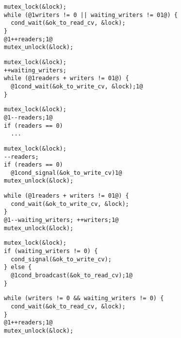 \usetikzlibrary{calc,fit,matrix,shapes.callouts}

\begingroup
{}
\newsavebox\rwLockPlusReaders%
\begin{lrbox}{\rwLockPlusReaders}
\begin{lstlisting}
mutex_lock(&lock);
while (@1writers != 0 || waiting_writers != 01@) {
  cond_wait(&ok_to_read_cv, &lock);
}
@1++readers;1@
mutex_unlock(&lock);
\end{lstlisting}
\end{lrbox}
\newsavebox\rwLockPlusWriters%
\begin{lrbox}{\rwLockPlusWriters}
\begin{lstlisting}
mutex_lock(&lock);
++waiting_writers;
while (@1readers + writers != 01@) {
  @1cond_wait(&ok_to_write_cv, &lock);1@
}
\end{lstlisting}
\end{lrbox}
\newsavebox\rwLockMinusReaders%
\begin{lrbox}{\rwLockMinusReaders}
\begin{lstlisting}
mutex_lock(&lock);
@1--readers;1@
if (readers == 0)
  ...
\end{lstlisting}
\end{lrbox}
\newsavebox\rwLockMinusReadersSignal%
\begin{lrbox}{\rwLockMinusReadersSignal}
\begin{lstlisting}
mutex_lock(&lock);
--readers;
if (readers == 0)
  @1cond_signal(&ok_to_write_cv)1@
mutex_unlock(&lock);
\end{lstlisting}
\end{lrbox}
\newsavebox\rwLockWriterGo%
\begin{lrbox}{\rwLockWriterGo}
\begin{lstlisting}
while (@1readers + writers != 01@) {
  cond_wait(&ok_to_write_cv, &lock);
}
@1--waiting_writers; ++writers;1@
mutex_unlock(&lock);
\end{lstlisting}
\end{lrbox}
\mnewsavebox{\rwLockReaderGoWriter}
\begin{lrbox}{\rwLockReaderGoWriter}
\begin{lstlisting}
mutex_lock(&lock);
if (waiting_writers != 0) {
  cond_signal(&ok_to_write_cv);
} else {
  @1cond_broadcast(&ok_to_read_cv);1@
}
\end{lstlisting}
\end{lrbox}
\newsavebox{\rwLockReaderGoEnd}
\begin{lrbox}{\rwLockReaderGoEnd}
\begin{lstlisting}
while (writers != 0 && waiting_writers != 0) {
  cond_wait(&ok_to_read_cv, &lock);
}
@1++readers;1@
mutex_unlock(&lock);
\end{lstlisting}
\end{lrbox}
\endgroup

